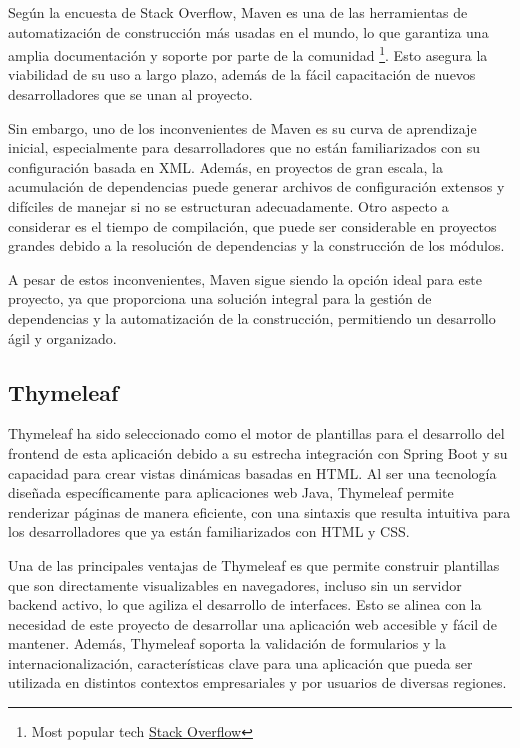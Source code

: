 \documentclass[draft]{scrbook}
\begin{document}
Según la encuesta de Stack Overflow, Maven es una de las herramientas de automatización de construcción más usadas en el mundo, lo que garantiza una amplia documentación y soporte por parte de la comunidad \footnote{Most popular tech \href{https://survey.stackoverflow.co/2024/technology\#most-popular-technologies-tools}{Stack Overflow}}. Esto asegura la viabilidad de su uso a largo plazo, además de la fácil capacitación de nuevos desarrolladores que se unan al proyecto.

Sin embargo, uno de los inconvenientes de Maven es su curva de aprendizaje inicial, especialmente para desarrolladores que no están familiarizados con su configuración basada en XML. Además, en proyectos de gran escala, la acumulación de dependencias puede generar archivos de configuración extensos y difíciles de manejar si no se estructuran adecuadamente. Otro aspecto a considerar es el tiempo de compilación, que puede ser considerable en proyectos grandes debido a la resolución de dependencias y la construcción de los módulos.

A pesar de estos inconvenientes, Maven sigue siendo la opción ideal para este proyecto, ya que proporciona una solución integral para la gestión de dependencias y la automatización de la construcción, permitiendo un desarrollo ágil y organizado.

\subsection{ Thymeleaf }

Thymeleaf ha sido seleccionado como el motor de plantillas para el desarrollo del frontend de esta aplicación debido a su estrecha integración con Spring Boot y su capacidad para crear vistas dinámicas basadas en HTML. Al ser una tecnología diseñada específicamente para aplicaciones web Java, Thymeleaf permite renderizar páginas de manera eficiente, con una sintaxis que resulta intuitiva para los desarrolladores que ya están familiarizados con HTML y CSS.

Una de las principales ventajas de Thymeleaf es que permite construir plantillas que son directamente visualizables en navegadores, incluso sin un servidor backend activo, lo que agiliza el desarrollo de interfaces. Esto se alinea con la necesidad de este proyecto de desarrollar una aplicación web accesible y fácil de mantener. Además, Thymeleaf soporta la validación de formularios y la internacionalización, características clave para una aplicación que pueda ser utilizada en distintos contextos empresariales y por usuarios de diversas regiones.
\end{document}
